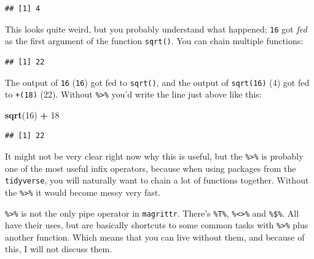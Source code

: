 \documentclass[]{gitbook}
\newenvironment{Shaded}{\begin{snugshade}}{\end{snugshade}}
\newcommand{\DataTypeTok}[1]{\textcolor[rgb]{0.13,0.29,0.53}{#1}}
\newcommand{\DecValTok}[1]{\textcolor[rgb]{0.00,0.00,0.81}{#1}}
\newcommand{\KeywordTok}[1]{\textcolor[rgb]{0.13,0.29,0.53}{\textbf{#1}}}
\newcommand{\NormalTok}[1]{#1}
\newcommand{\OperatorTok}[1]{\textcolor[rgb]{0.81,0.36,0.00}{\textbf{#1}}}
\newcommand{\StringTok}[1]{\textcolor[rgb]{0.31,0.60,0.02}{#1}}
\begin{document}
\begin{Shaded}
\end{Shaded}

\begin{verbatim}
## [1] 4
\end{verbatim}

This looks quite weird, but you probably understand what happened; \texttt{16} got \emph{fed} as the first
argument of the function \texttt{sqrt()}. You can chain multiple functions:

\begin{Shaded}
\end{Shaded}

\begin{verbatim}
## [1] 22
\end{verbatim}

The output of \texttt{16} (\texttt{16}) got fed to \texttt{sqrt()}, and the output of \texttt{sqrt(16)} (4) got fed to \texttt{+(18)}
(22). Without \texttt{\%\textgreater{}\%} you'd write the line just above like this:

\begin{Shaded}
\begin{Highlighting}[]
\KeywordTok{sqrt}\NormalTok{(}\DecValTok{16}\NormalTok{) }\OperatorTok{+}\StringTok{ }\DecValTok{18}
\end{Highlighting}
\end{Shaded}

\begin{verbatim}
## [1] 22
\end{verbatim}

It might not be very clear right now why this is useful, but the \texttt{\%\textgreater{}\%} is probably one of the
most useful infix operators, because when using packages from the \texttt{tidyverse}, you will
naturally want to chain a lot of functions together. Without the \texttt{\%\textgreater{}\%} it would become messy very fast.

\texttt{\%\textgreater{}\%} is not the only pipe operator in \texttt{magrittr}. There's \texttt{\%T\%}, \texttt{\%\textless{}\textgreater{}\%} and \texttt{\%\$\%}. All have their
uses, but are basically shortcuts to some common tasks with \texttt{\%\textgreater{}\%} plus another function. Which
means that you can live without them, and because of this, I will not discuss them.
\end{document}
